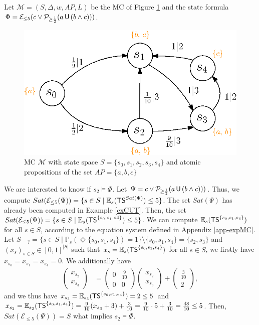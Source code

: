 \begin{example}
  Let $\mathcal{M}=(S, \Delta, w, AP, L)$ be the MC of Figure \ref{CUTexample3} and the state formula $\Phi = \mathcal{E}_{\leq{5}}(c \vee \mathcal{P}_{\geq \frac{1}{2}}(a \,\text{\sffamily U}\, (b \wedge c)))$.
  \begin{figure}[h]
    \centering
    \includegraphics[width=0.5\linewidth]{resources/CUTexample3}
    \captionsetup{justification=centering}
    \caption{MC $\mathcal{M}$ with state space $S = \{s_0, s_1, s_2, s_3, s_4\}$ and atomic propositions of the set $AP = \{a, b, c\}$}
    \label{CUTexample3}
  \end{figure}
  We are interested to know if $s_2 \models \Phi$.
  Let $\Psi = c \vee \mathcal{P}_{\geq \frac{1}{2}}(a \,\text{\sffamily U}\, (b \wedge c)))$.
  Thus, we compute $Sat(\mathcal{E}_{\leq 5}(\Psi)) = \{s \in S \; | \; \mathbb{E}_s(\text{\sffamily TS}^{Sat(\Psi)}) \leq 5\}$. The set $Sat(\Psi)$
  has already been computed in Example \ref{exCUT}.
  Then, the set $Sat(\mathcal{E}_{\leq 5}(\Psi)) = \{s \in S \;|\; \mathbb{E}_s(\text{\sffamily TS}^{\{s_0, s_1, s4\}})\leq 5\}$.
  We can compute
  $\mathbb{E}_s(\text{\sffamily TS}^{\{s_0, s_1, s_4\}})$ for all $s \in S$, according to the equation system defined in Appendix \ref{app-expMC}.
  Let $S_{=?} = \{ s \in S \; | \; \mathbb{P}_s(\Diamond \{s_0, s_1, s_4\}) = 1 \} \setminus \{s_0, s_1, s_4\} =
  \{s_2, s_3\}$ and $(x_s)_{s \in S} \in [0, 1]^{|S|}$ such that $x_s = \mathbb{E}_s(\text{\sffamily TS}^{\{s_0, s_1, s_4\}})$ for all $s \in S$, we firstly have $x_{s_0} = x_{s_1} = x_{s_4} = 0$.
  We additionally have
  \begin{align*}
    \begin{pmatrix}
      x_{s_2}\\[0.3em]
      x_{s_3}
  	\end{pmatrix} &=
    \begin{pmatrix}
      0 & \frac{9}{10} \\[0.3em]
      0  & 0
    \end{pmatrix}
    \begin{pmatrix}
      x_{s_2}\\[0.3em]
      x_{s_3}
  	\end{pmatrix}
    +
    \begin{pmatrix}
      \frac{3}{10}\\[0.3em]
      2
    \end{pmatrix},
  \end{align*}
  and we thus have $x_{s_3} = \mathbb{E}_{s_3}(\text{\sffamily TS}^{\{s_0, s_1, s_4\}}) = 2 \leq 5$ and $
    x_{s_2} = \mathbb{E}_{s_2}(\text{\sffamily TS}^{\{s_0, s_1, s_4\}}) = \frac{9}{10} (x_{s_3} + 3) + \frac{3}{10}
    = \frac{9}{10} \cdot 5 + \frac{3}{10}
    = \frac{48}{10}\leq 5$. Then, $Sat(\mathcal{E}_{\leq 5}(\Psi)) = S$ what implies $s_2 \models \Phi$.
\end{example}

